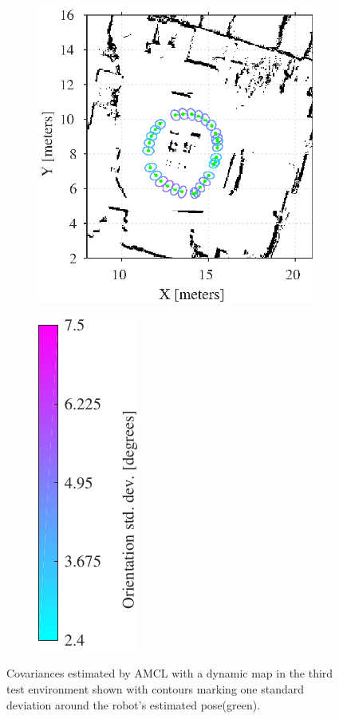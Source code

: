 \begin{figure}[htbp]
	\centering
	\begin{subfigure}[t]{0.55\textwidth}
		\includegraphics[scale=1.0]{chapters/evaluation/figures/localization_dynamic_map3}		
	\end{subfigure}
	\begin{subfigure}[t]{0.2\textwidth}
		\includegraphics[scale=1.0]{chapters/evaluation/figures/localization_std_color_bar-crop}
	\end{subfigure}
	\label{fig:amcl_covariance_dynamic3}
	\caption{Covariances estimated by AMCL with a dynamic map in the third test environment shown with contours marking one standard deviation around the robot's estimated pose(green).}
\end{figure}